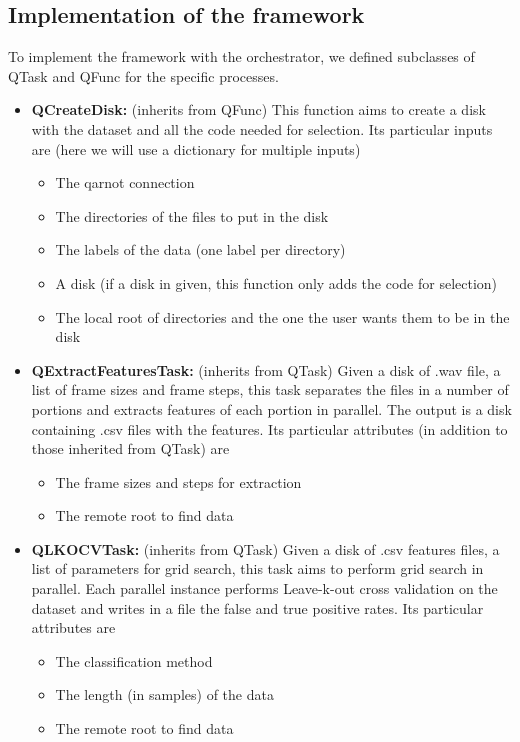 \documentclass[10pt, conference, compsocconf]{IEEEtran}
\begin{document}
\subsection{Implementation of the framework}
To implement the framework with the orchestrator, we defined subclasses of QTask and QFunc for the specific processes.
\begin{itemize}
\item \textbf{QCreateDisk:} (inherits from QFunc) This function aims to create a disk with the dataset and all the code needed for selection.
  Its particular inputs are (here we will use a dictionary for multiple inputs)
  \begin{itemize}
  \item The qarnot connection
  \item The directories of the files to put in the disk
  \item The labels of the data (one label per directory)
  \item A disk (if a disk in given, this function only adds the code for selection)
  \item The local root of directories and the one the user wants them to be in the disk
  \end{itemize}
\item \textbf{QExtractFeaturesTask:} (inherits from QTask) Given a disk of .wav file, a list of frame sizes and frame steps, this task separates the files in a number of portions and extracts features of each portion in parallel. The output is a disk containing .csv files with the features.
  Its particular attributes (in addition to those inherited from QTask) are
  \begin{itemize}
  \item The frame sizes and steps for extraction
  \item The remote root to find data
  \end{itemize}
\item \textbf{QLKOCVTask:} (inherits from QTask) Given a disk of .csv features files, a list of parameters for grid search, this task aims to perform grid search in parallel. Each parallel instance performs Leave-k-out cross validation on the dataset and writes in a file the false and true positive rates.
  Its particular attributes are
  \begin{itemize}
  \item The classification method
  \item The length (in samples) of the data
  \item The remote root to find data

\end{itemize}
\end{itemize}
\end{document}

